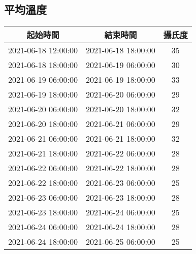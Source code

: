 \documentclass{article}%
\begin{document}
\begin{center}
\section{平均溫度}%
\label{sec:}%
\begin{tabular}{|c|c|c|}%
\hline%
起始時間&結束時間&攝氏度\\%
\hline%
2021{-}06{-}18 12:00:00&2021{-}06{-}18 18:00:00&35\\%
\hline%
2021{-}06{-}18 18:00:00&2021{-}06{-}19 06:00:00&30\\%
\hline%
2021{-}06{-}19 06:00:00&2021{-}06{-}19 18:00:00&33\\%
\hline%
2021{-}06{-}19 18:00:00&2021{-}06{-}20 06:00:00&29\\%
\hline%
2021{-}06{-}20 06:00:00&2021{-}06{-}20 18:00:00&32\\%
\hline%
2021{-}06{-}20 18:00:00&2021{-}06{-}21 06:00:00&29\\%
\hline%
2021{-}06{-}21 06:00:00&2021{-}06{-}21 18:00:00&32\\%
\hline%
2021{-}06{-}21 18:00:00&2021{-}06{-}22 06:00:00&28\\%
\hline%
2021{-}06{-}22 06:00:00&2021{-}06{-}22 18:00:00&28\\%
\hline%
2021{-}06{-}22 18:00:00&2021{-}06{-}23 06:00:00&25\\%
\hline%
2021{-}06{-}23 06:00:00&2021{-}06{-}23 18:00:00&28\\%
\hline%
2021{-}06{-}23 18:00:00&2021{-}06{-}24 06:00:00&25\\%
\hline%
2021{-}06{-}24 06:00:00&2021{-}06{-}24 18:00:00&28\\%
\hline%
2021{-}06{-}24 18:00:00&2021{-}06{-}25 06:00:00&25\\%
\hline%
\end{tabular}

%

\end{center}
\end{document}
